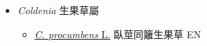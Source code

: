 
  \begin{itemize}
 \item[] \textit{Coldenia} 生果草屬
                    
  \begin{itemize}
        \item[] \href{http://www.theplantlist.org/tpl1.1/search?q=Coldenia+procumbens}{\textit{C. procumbens} L.}   臥莖同籬生果草 EN
  \end{itemize}
  \end{itemize}
